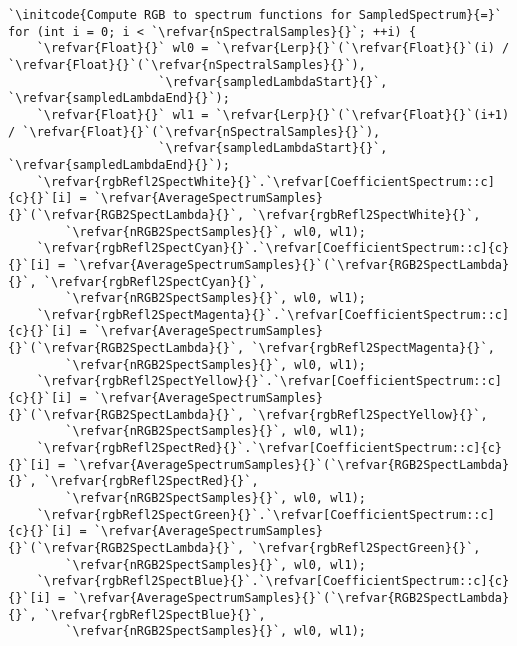 \begin{lstlisting}
`\initcode{Compute RGB to spectrum functions for SampledSpectrum}{=}`
for (int i = 0; i < `\refvar{nSpectralSamples}{}`; ++i) {
    `\refvar{Float}{}` wl0 = `\refvar{Lerp}{}`(`\refvar{Float}{}`(i) / `\refvar{Float}{}`(`\refvar{nSpectralSamples}{}`), 
                     `\refvar{sampledLambdaStart}{}`, `\refvar{sampledLambdaEnd}{}`);
    `\refvar{Float}{}` wl1 = `\refvar{Lerp}{}`(`\refvar{Float}{}`(i+1) / `\refvar{Float}{}`(`\refvar{nSpectralSamples}{}`), 
                     `\refvar{sampledLambdaStart}{}`, `\refvar{sampledLambdaEnd}{}`);
    `\refvar{rgbRefl2SpectWhite}{}`.`\refvar[CoefficientSpectrum::c]{c}{}`[i] = `\refvar{AverageSpectrumSamples}{}`(`\refvar{RGB2SpectLambda}{}`, `\refvar{rgbRefl2SpectWhite}{}`, 
        `\refvar{nRGB2SpectSamples}{}`, wl0, wl1);
    `\refvar{rgbRefl2SpectCyan}{}`.`\refvar[CoefficientSpectrum::c]{c}{}`[i] = `\refvar{AverageSpectrumSamples}{}`(`\refvar{RGB2SpectLambda}{}`, `\refvar{rgbRefl2SpectCyan}{}`, 
        `\refvar{nRGB2SpectSamples}{}`, wl0, wl1);
    `\refvar{rgbRefl2SpectMagenta}{}`.`\refvar[CoefficientSpectrum::c]{c}{}`[i] = `\refvar{AverageSpectrumSamples}{}`(`\refvar{RGB2SpectLambda}{}`, `\refvar{rgbRefl2SpectMagenta}{}`, 
        `\refvar{nRGB2SpectSamples}{}`, wl0, wl1);
    `\refvar{rgbRefl2SpectYellow}{}`.`\refvar[CoefficientSpectrum::c]{c}{}`[i] = `\refvar{AverageSpectrumSamples}{}`(`\refvar{RGB2SpectLambda}{}`, `\refvar{rgbRefl2SpectYellow}{}`, 
        `\refvar{nRGB2SpectSamples}{}`, wl0, wl1);
    `\refvar{rgbRefl2SpectRed}{}`.`\refvar[CoefficientSpectrum::c]{c}{}`[i] = `\refvar{AverageSpectrumSamples}{}`(`\refvar{RGB2SpectLambda}{}`, `\refvar{rgbRefl2SpectRed}{}`, 
        `\refvar{nRGB2SpectSamples}{}`, wl0, wl1);
    `\refvar{rgbRefl2SpectGreen}{}`.`\refvar[CoefficientSpectrum::c]{c}{}`[i] = `\refvar{AverageSpectrumSamples}{}`(`\refvar{RGB2SpectLambda}{}`, `\refvar{rgbRefl2SpectGreen}{}`, 
        `\refvar{nRGB2SpectSamples}{}`, wl0, wl1);
    `\refvar{rgbRefl2SpectBlue}{}`.`\refvar[CoefficientSpectrum::c]{c}{}`[i] = `\refvar{AverageSpectrumSamples}{}`(`\refvar{RGB2SpectLambda}{}`, `\refvar{rgbRefl2SpectBlue}{}`, 
        `\refvar{nRGB2SpectSamples}{}`, wl0, wl1);


\end{lstlisting}
